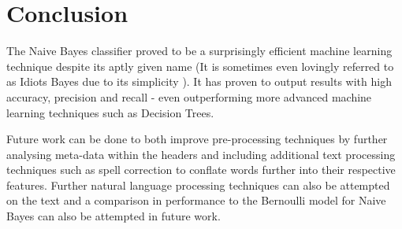 \section{Conclusion}

The Naive Bayes classifier proved to be a surprisingly efficient machine learning technique despite its aptly given name (It is sometimes even lovingly referred to as Idiots Bayes due to its simplicity \cite{idiotsbayes2001}). 
It has proven to output results with high accuracy, precision and recall - even outperforming more advanced machine learning techniques such as Decision Trees.

Future work can be done to both improve pre-processing techniques by further analysing meta-data within the headers and including additional text processing techniques such as spell correction to conflate words further into their respective features. Further natural language processing techniques can also be attempted on the text and a comparison in performance to the Bernoulli model for Naive Bayes can also be attempted in future work.

